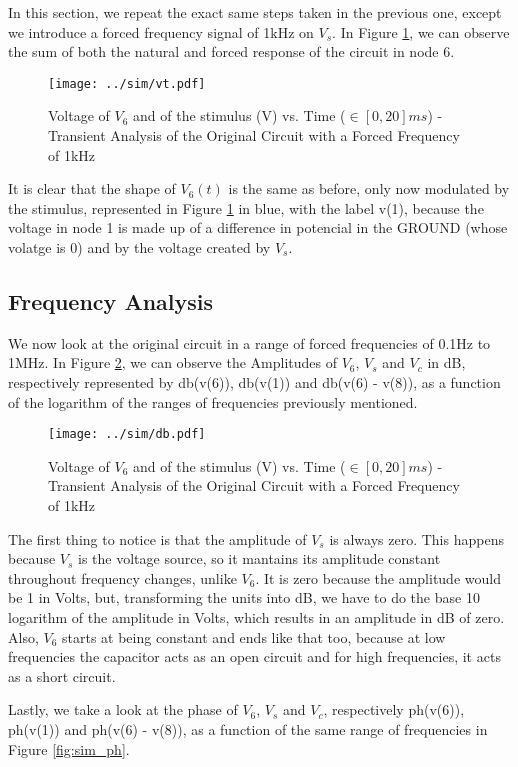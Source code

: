 In this section, we repeat the exact same steps taken in the previous one, except we introduce a forced frequency signal of 1kHz on $V_s$. In Figure \ref{fig:sim-graph4}, we can observe the sum of both the natural and forced response of the circuit in node 6.


\begin{figure}[H] \centering
\texttt{[image: ../sim/vt.pdf]}
\caption{Voltage of $V_6$ and of the stimulus (V) vs. Time ($\in [0, 20]ms$) - Transient Analysis of the Original Circuit with a Forced Frequency of 1kHz}
\label{fig:sim-graph4}
\end{figure}

It is clear that the shape of $V_6(t)$ is the same as before, only now modulated by the stimulus, represented in Figure \ref{fig:sim-graph4} in blue, with the label v(1), because the voltage in node 1 is made up of a difference in potencial in the GROUND (whose volatge is 0) and by the voltage created by $V_s$.

\subsection{Frequency Analysis}
\label{subsec:sim_freq}

We now look at the original circuit in a range of forced frequencies of 0.1Hz to 1MHz. In Figure \ref{fig:sim_db}, we can observe the Amplitudes of $V_6$, $V_s$ and $V_c$ in dB, respectively represented by db(v(6)), db(v(1)) and db(v(6) - v(8)), as a function of the logarithm of the ranges of frequencies previously mentioned.

\begin{figure}[H] \centering
\texttt{[image: ../sim/db.pdf]}
\caption{Voltage of $V_6$ and of the stimulus (V) vs. Time ($\in [0, 20]ms$) - Transient Analysis of the Original Circuit with a Forced Frequency of 1kHz}
\label{fig:sim_db}
\end{figure}

The first thing to notice is that the amplitude of $V_s$ is always zero. This happens because $V_s$ is the voltage source, so it mantains its amplitude constant throughout frequency changes, unlike $V_6$. It is zero because the amplitude would be 1 in Volts, but, transforming the units into dB, we have to do the base 10 logarithm of the amplitude in Volts, which results in an amplitude in dB of zero. Also, $V_6$ starts at being constant and ends like that too, because at low frequencies the capacitor acts as an open circuit and for high frequencies, it acts as a short circuit.
\par
Lastly, we take a look at the phase of $V_6$, $V_s$ and $V_c$, respectively ph(v(6)), ph(v(1)) and ph(v(6) - v(8)), as a function of the same range of frequencies in Figure \ref{fig:sim_ph}.

